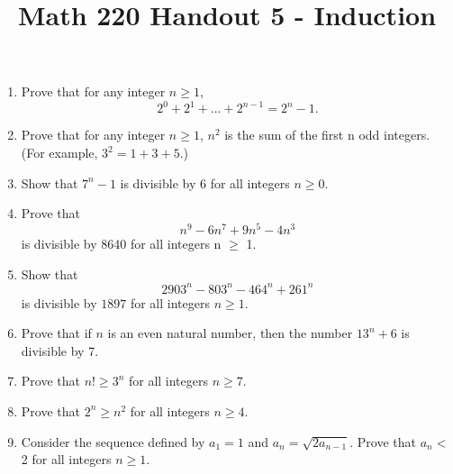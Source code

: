 \documentclass[12pt, reqno]{amsart}
\begin{document}
\title[Math 220 Handout 5 - Induction]{Math 220 Handout 5 - Induction}\maketitle

\begin{enumerate}

\item Prove that for any integer $n\geq 1$, $$2^0 +2^1 +...+2^{n-1} =2^{n}-1.$$

\item Prove that for any integer $n \geq 1$, $n^2$ is the sum of the first n odd integers. (For example, $3^2 =1+3+5$.)

\item Show that $7^n - 1$ is divisible by 6 for all integers $n \geq 0$.


\item Prove that $$n^9 - 6n^7 + 9n^5 - 4n^3$$ is divisible by 8640 for all integers n $\geq$ 1.




\item Show that 
\[
2903^n - 803^n - 464^n + 261^n
\]
is divisible by $1897$ for all integers $n \geq 1$.

\item Prove that if $n$ is an even natural number, then the number $13^n + 6$ is divisible by 7.


\item Prove that $n! \geq 3^n$ for all integers $n \geq 7$.

\item Prove that $2^n \geq n^2$ for all integers $n \geq 4$.

\item Consider the sequence defined by $a_1 = 1$ and $a_n = \sqrt{2 a_{n-1}}$. Prove that $a_n <$ 2 for all integers $n \geq 1$.


\end{enumerate}
\end{document}
